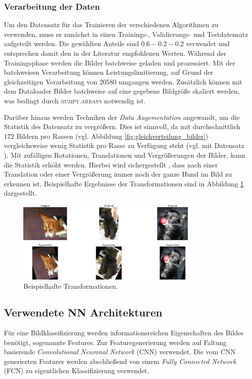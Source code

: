 \subsubsection{Verarbeitung der Daten}
Um den Datensatz für das Trainieren der verschiedenen Algorithmen zu verwenden,
muss er zunächst in einen Trainings-, Validierungs- und Testdatensatz aufgeteilt
werden. Die gewählten Anteile sind $0.6-0.2-0.2$ verwendet und entsprechen damit
den in der Literatur \cite[S. 29]{hands_on_machine_learning} empfohlenen Werten.
Während der Trainingsphase werden die Bilder batchweise geladen und prozessiert.
Mit der batchweisen Verarbeitung können Leistungslimitierung, auf Grund der
gleichzeitigen Verarbeitung von $20580$ umgangen werden.
Zusätzlich können mit dem Dataloader Bilder batchweise auf eine gegebene
Bildgröße skaliert werden, was bedingt durch \textsc{numpy.arrays}
notwendig ist.

Darüber hinaus werden Techniken der \emph{Data Augementation} angewandt, um
die Statistik des Datensatz zu vergrößern. Dies ist sinnvoll, da mit durchschnittlich
$172$ Bildern pro Rassen (vgl. Abbildung \ref{fig:gleichverteilung_bilder})
vergleichsweise wenig Statistik pro Rasse zu
Verfügung steht (vgl. mit Datensatz \cite{google_open_image}).
Mit zufälligen Rotationen, Translationen und Vergrößerungen
der Bilder, kann die Statistik erhöht werden. Hierbei wird sichergestellt
, dass nach einer Translation oder einer Vergrößerung immer noch der ganze Hund
im Bild zu erkennen ist. Beispielhafte Ergebnisse der Transformationen sind in Abbildung
\ref{fig:data_augementation} dargestellt.
\begin{figure}
\centering
\includegraphics[width=0.8\textwidth]{../../final_data/general/data_augementation.pdf}
\caption{Beispielhafte Transformationen.}
\label{fig:data_augementation}
\end{figure}

\subsection{Verwendete NN Architekturen}\label{sec:NNarchitekturen}
Für eine Bildklassifizierung werden informationsreichen Eigenschaften
des Bildes benötigt, sogenannte Features. Zur Featuregenerierung werden auf Faltung
basierende \emph{Convolutional Neuronal Network} (CNN) verwendet.
Die vom CNN generierten Features werden abschließend von einem
\emph{Fully Connected Network} (FCN) zu eigentlichen Klassifizierung verwendet.

